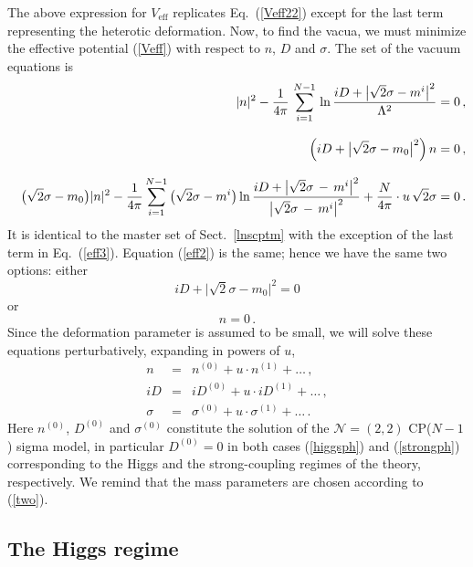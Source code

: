\documentclass[epsfig,12pt]{article}
\def\beq{\begin{equation}}
\def\eeq{\end{equation}}
\def\beqn{\begin{eqnarray}}
\def\eeqn{\end{eqnarray}}
\def\beqn{\begin{eqnarray}}
\def\eeqn{\end{eqnarray}}
\def\beq{\begin{equation}}
\def\eeq{\end{equation}}
\newcommand{\ntwot}{${\mathcal N}= \left(2,2\right) $ }
\newcommand{\nz}{{n^{(0)}}}
\newcommand{\no}{{n^{(1)}}}
\newcommand{\Dz}{{D^{(0)}}}
\newcommand{\Do}{{D^{(1)}}}
\newcommand{\sigz}{{\sigma^{(0)}}}
\newcommand{\sigo}{{\sigma^{(1)}}}
\begin{document}
{The above expression for $ V_\text{eff} $ replicates Eq.~(\ref{Veff22}) except for the last term 
representing the heterotic deformation.
Now, to find the vacua, we must minimize the 
effective potential (\ref{Veff}) with respect to $n$, $D$ and $ \sigma $. 
The set of the vacuum equations is
\beqn
\label{eff1}
	&&
	|n|^2  -  \frac{1}{4\pi} \,\sum_{i=1}^{N-1}\, 
		{\rm ln}\, 
		\frac{i D + \bigl| \sqrt{2}\sigma -  m^i \bigr|^2}
							{\Lambda^2}   = 0\,, 
\\[3mm]				
	&&
	\left( i D + \bigl|\sqrt{2}\sigma - m_0 \bigr|^2 \right) n = 0\,, 
	\label{eff2}
	\\[3mm]
	&&
	\bigl(\sqrt{2}\sigma - {m_0} \bigr)|n|^2 
		-
	\frac{1}{4\pi} \sum_{i=1}^{N-1}\,
			\bigl(\sqrt{2}\sigma - m^i \bigr)\,
		{\rm ln}\, 
		\frac{i D + \bigl| \sqrt{2}\sigma \,-\,  m^i \bigr|^2}
		{\bigl| \sqrt{2}\sigma \,-\,  m^i \bigr|^2 }
		+ \frac{N}{4\pi} \cdot u\, \sqrt{2}\sigma = 0\,.
\label{eff3}
\nonumber\\
\eeqn
It is identical to the master set of Sect.~\ref{lnscptm}
with the exception of the last term in Eq.~(\ref{eff3}).
Equation (\ref{eff2}) is the same; hence we have the same two options:
 either
\beq
\label{higgsph}
	 iD + \bigl| \sqrt{2}\sigma - { m_0} \bigr|^2 = 0  
\eeq
or
\beq
\label{strongph}
	 n = 0 \,. 
\eeq
Since the deformation parameter is assumed to be small, we 
will solve these equations perturbatively, expanding in powers of  $ u $,
\beqn
	n &=& \nz  + u \cdot \no + \ldots\,,
	\nonumber
	 \\[3mm]
	iD &=& i\Dz  + u \cdot i\Do + \ldots\,, 
	\nonumber
	\\[3mm]
	\sigma &=& \sigz + u \cdot \sigo + \ldots\,.
\eeqn
	Here $ \nz $, $ \Dz $ and $\sigz$ constitute the solution of the \ntwot CP($N-1$) sigma model,
	in particular $ \Dz = 0 $ in both cases (\ref{higgsph}) and  
	(\ref{strongph}) corresponding to the Higgs and the strong-coupling regimes of the theory,
	respectively. We remind that the mass parameters are chosen according to (\ref{two}).
	
	
%
%
\subsection{The Higgs regime}
\label{subshr}

}
\end{document}
